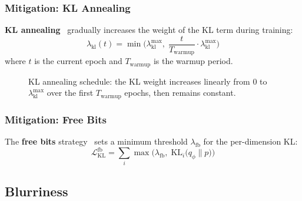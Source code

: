 \documentclass[11pt, a4paper]{article}
\newcommand{\loss}{\mathcal{L}}
\newcommand{\KL}{\mathrm{KL}}
\begin{document}
\subsubsection{Mitigation: KL Annealing}

\textbf{KL annealing}~\cite{bowman2016kl_anneal} gradually increases the weight of the KL term during training:
\begin{equation}
  \lambda_{\text{kl}}(t) = \min\!\Big(\lambda_{\text{kl}}^{\max},\; \frac{t}{T_{\text{warmup}}} \cdot \lambda_{\text{kl}}^{\max}\Big)
  \label{eq:kl_anneal}
\end{equation}
where \(t\) is the current epoch and \(T_{\text{warmup}}\) is the warmup period.

\begin{figure}[H]
\centering
{}
\caption{KL annealing schedule: the KL weight increases linearly from 0 to \(\lambda_{\text{kl}}^{\max}\) over the first \(T_{\text{warmup}}\) epochs, then remains constant.}
\label{fig:kl_anneal}
\end{figure}

\subsubsection{Mitigation: Free Bits}

The \textbf{free bits} strategy~\cite{kingma2016freebits} sets a minimum threshold \(\lambda_{\text{fb}}\) for the per-dimension KL:
\begin{equation}
  \loss_{\text{KL}}^{\text{fb}} = \sum_{i} \max\!\Big(\lambda_{\text{fb}},\; \KL_i\big(q_\phi \| p\big)\Big)
  \label{eq:free_bits}
\end{equation}

\subsection{Blurriness}
\end{document}
